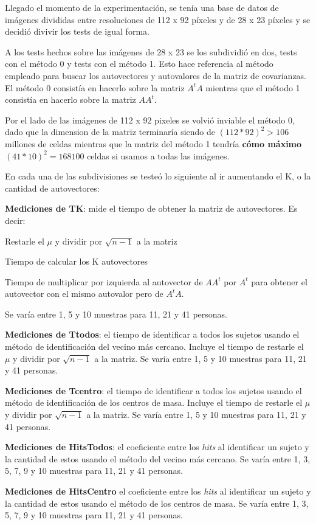 Llegado el momento de la experimentación, se tenía una base de datos de imágenes divididas entre
resoluciones de 112 x 92 píxeles y de 28 x 23 píxeles y se decidió divivir los tests de igual forma.

A los tests hechos sobre las imágenes de 28 x 23 se los subdividió en dos, tests con el método 0 y
tests con el método 1. Esto hace referencia al método empleado para buscar los autovectores y
autovalores de la matriz de covarianzas. El método 0 consistía en hacerlo sobre la matriz $A^t A$
mientras que el método 1 consistía en hacerlo sobre la matriz $A A^t$.

Por el lado de las imágenes de 112 x 92 pixeles se volvió inviable el método 0, dado que la
dimension de la matriz terminaría siendo de $(112*92)^2 > 106$ millones de celdas mientras que la
matriz del método 1 tendría \textbf{cómo máximo} $(41*10)^2 = 168 100$ celdas si usamos a todas las
imágenes.

En cada una de las subdivisiones se testeó lo siguiente al ir aumentando el K, o la cantidad de
autovectores:
\begin{compactitem}
  \item \textbf{Mediciones de TK}: mide el tiempo de obtener la matriz de autovectores. Es decir:
  \begin{compactenum}
    \item Restarle el $\mu$ y dividir por $\sqrt{n-1}$ a la matriz
    \item Tiempo de calcular los K autovectores
    \item Tiempo de multiplicar por izquierda al autovector de $A A^t$ por $A^t$ para obtener el
    autovector con el mismo autovalor pero de $A^t A$.
  \end{compactenum}
  Se varía entre 1, 5 y 10 muestras para 11, 21 y 41 personas.
  \item \textbf{Mediciones de Ttodos}: el tiempo de identificar a todos los sujetos usando el método
  de identificación del vecino más cercano. Incluye el tiempo de restarle el $\mu$ y dividir por
  $\sqrt{n-1}$ a la matriz. Se varía entre 1, 5 y 10 muestras para 11, 21 y 41 personas.
  \item \textbf{Mediciones de Tcentro}: el tiempo de identificar a todos los sujetos usando el método
  de identificación de los centros de masa. Incluye el tiempo de restarle el $\mu$ y dividir por
  $\sqrt{n-1}$ a la matriz. Se varía entre 1, 5 y 10 muestras para 11, 21 y 41 personas.
  \item \textbf{Mediciones de HitsTodos}: el coeficiente entre los \textit{hits} al identificar un
  sujeto y la cantidad de estos usando el método del vecino más cercano. Se varía entre 1, 3, 5, 7,
  9 y 10 muestras para 11, 21 y 41 personas.
  \item \textbf{Mediciones de HitsCentro} el coeficiente entre los \textit{hits} al identificar un
  sujeto y la cantidad de estos usando el método de los centros de masa. Se varía entre 1, 3, 5, 7,
  9 y 10 muestras para 11, 21 y 41 personas.
\end{compactitem}

